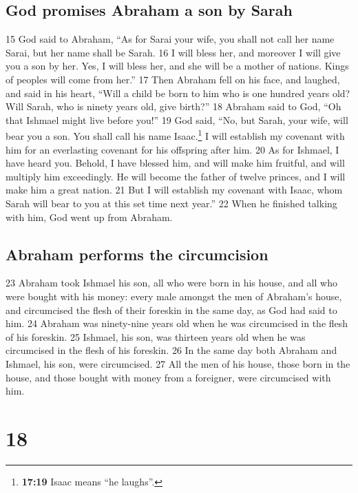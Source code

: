 \hypertarget{god-promises-abraham-a-son-by-sarah}{%
\subsection{God promises Abraham a son by
Sarah}\label{god-promises-abraham-a-son-by-sarah}}

{15} God said to Abraham, ``As for Sarai your wife, you shall not call
her name Sarai, but her name shall be Sarah. {16} I will bless her, and
moreover I will give you a son by her. Yes, I will bless her, and she
will be a mother of nations. Kings of peoples will come from her.'' {17}
Then Abraham fell on his face, and laughed, and said in his heart,
``Will a child be born to him who is one hundred years old? Will Sarah,
who is ninety years old, give birth?'' {18} Abraham said to God, ``Oh
that Ishmael might live before you!'' {19} God said, ``No, but Sarah,
your wife, will bear you a son. You shall call his name
Isaac.\footnote{\textbf{17:19} Isaac means ``he laughs''.} I will
establish my covenant with him for an everlasting covenant for his
offspring after him. {20} As for Ishmael, I have heard you. Behold, I
have blessed him, and will make him fruitful, and will multiply him
exceedingly. He will become the father of twelve princes, and I will
make him a great nation. {21} But I will establish my covenant with
Isaac, whom Sarah will bear to you at this set time next year.'' {22}
When he finished talking with him, God went up from Abraham.

\hypertarget{abraham-performs-the-circumcision}{%
\subsection{Abraham performs the
circumcision}\label{abraham-performs-the-circumcision}}

{23} Abraham took Ishmael his son, all who were born in his house, and
all who were bought with his money: every male amongst the men of
Abraham's house, and circumcised the flesh of their foreskin in the same
day, as God had said to him. {24} Abraham was ninety-nine years old when
he was circumcised in the flesh of his foreskin. {25} Ishmael, his son,
was thirteen years old when he was circumcised in the flesh of his
foreskin. {26} In the same day both Abraham and Ishmael, his son, were
circumcised. {27} All the men of his house, those born in the house, and
those bought with money from a foreigner, were circumcised with him.

\hypertarget{section-17}{%
\section{18}\label{section-17}}

